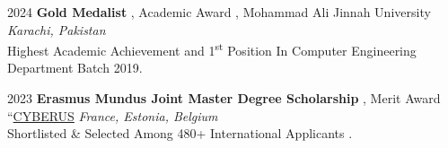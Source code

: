 

\begin{rSection}{}
  {\hspace{-0.5em}2024\hspace{1em}}{\bodyfont\bfseries\color{darktext} {Gold Medalist}}{ , Academic Award , Mohammad Ali Jinnah University
  } \hfill{\bodyfont\slshape\color{awesome} {Karachi, Pakistan}}
  \\Highest Academic Achievement and 1\textsuperscript{st} Position In Computer Engineering Department Batch 2019.
  \end{rSection}

  
\begin{rSection}{}
{\hspace{-0.5em}2023\hspace{1em}}{\bodyfont\bfseries\color{darktext} {Erasmus Mundus Joint Master Degree Scholarship}}{ , Merit Award ``\href{https://master-cyberus.eu/programme/overview}{CYBERUS}
} \hfill{\bodyfont\slshape\color{awesome} {France, Estonia, Belgium}}
\\Shortlisted \& Selected Among 480+ International Applicants .
\end{rSection}

